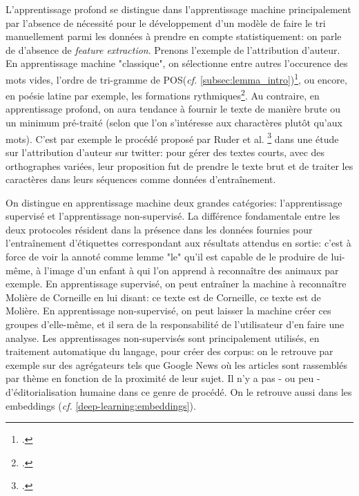 L'apprentissage profond se distingue dans l'apprentissage machine principalement par l'absence de nécessité pour le développement d'un modèle de faire le tri manuellement parmi les données à prendre en compte statistiquement: on parle de d'absence de \textit{feature extraction}. Prenons l'exemple de l'attribution d'auteur. En apprentissage machine "classique", on sélectionne entre autres l'occurence des mots vides, l'ordre de tri-gramme de POS(\textit{cf.} \ref{subsec:lemma_intro})\footcite{Cafieroeaax5489}, ou encore, en poésie latine par exemple, les formations rythmiques\footcite{nagy_metre_nodate}. Au contraire, en apprentissage profond, on aura tendance à fournir le texte de manière brute ou un minimum pré-traité (selon que l'on s'intéresse aux charactères plutôt qu'aux mots). C'est par exemple le procédé proposé par Ruder et al. \footcite{ruder_character-level_2016} dans une étude sur l'attribution d'auteur sur twitter: pour gérer des textes courts, avec des orthographes variées, leur proposition fut de prendre le texte brut et de traiter les caractères dans leurs séquences comme données d'entraînement.

On distingue en apprentissage machine deux grandes catégories: l'apprentissage supervisé et l'apprentissage non-supervisé.  La différence fondamentale entre les deux protocoles résident dans la présence dans les données fournies pour l'entraînement d'étiquettes correspondant aux résultats attendus en sortie: c'est à force de voir la annoté comme lemme "le" qu'il est capable de le produire de lui-même, à l'image d'un enfant à qui l'on apprend à reconnaître des animaux par exemple. En apprentissage supervisé, on peut entraîner la machine à reconnaître Molière de Corneille en lui disant: ce texte est de Corneille, ce texte est de Molière. En apprentissage non-supervisé, on peut laisser la machine créer ces groupes d'elle-même, et il sera de la responsabilité de l'utilisateur d'en faire une analyse. Les apprentissages non-supervisés sont principalement utilisés, en traitement automatique du langage, pour créer des corpus: on le retrouve par exemple sur des agrégateurs tels que Google News où les articles sont rassemblés par thème en fonction de la proximité de leur sujet. Il n'y a pas - ou peu - d'éditorialisation humaine dans ce genre de procédé. On le retrouve aussi dans les embeddings (\textit{cf.} \ref{deep-learning:embeddings}).

